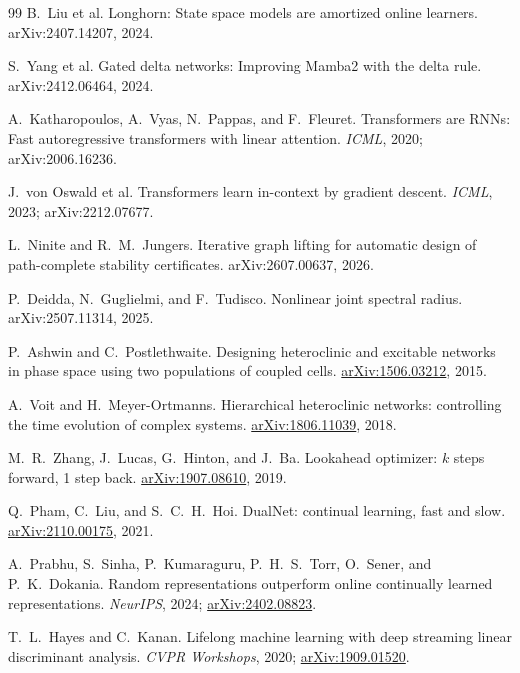 \documentclass[11pt]{article}
\begin{document}
\begin{thebibliography}{99}
 B.~Liu et al.
Longhorn: State space models are amortized online learners. arXiv:2407.14207, 2024.

 S.~Yang et al.
Gated delta networks: Improving Mamba2 with the delta rule. arXiv:2412.06464, 2024.

 A.~Katharopoulos, A.~Vyas, N.~Pappas, and F.~Fleuret.
Transformers are RNNs: Fast autoregressive transformers with linear attention.
\emph{ICML}, 2020; arXiv:2006.16236.

 J.~von Oswald et al.
Transformers learn in-context by gradient descent. \emph{ICML}, 2023; arXiv:2212.07677.

 L.~Ninite and R.~M.~Jungers.
Iterative graph lifting for automatic design of path-complete stability certificates.
arXiv:2607.00637, 2026.

 P.~Deidda, N.~Guglielmi, and F.~Tudisco.
Nonlinear joint spectral radius.
arXiv:2507.11314, 2025.

 P.~Ashwin and C.~Postlethwaite.
Designing heteroclinic and excitable networks in phase space using two
populations of coupled cells.
\href{https://arxiv.org/abs/1506.03212}{arXiv:1506.03212}, 2015.

 A.~Voit and H.~Meyer-Ortmanns.
Hierarchical heteroclinic networks: controlling the time evolution of
complex systems.
\href{https://arxiv.org/abs/1806.11039}{arXiv:1806.11039}, 2018.

 M.~R.~Zhang, J.~Lucas, G.~Hinton, and J.~Ba.
Lookahead optimizer: $k$ steps forward, 1 step back.
\href{https://arxiv.org/abs/1907.08610}{arXiv:1907.08610}, 2019.

 Q.~Pham, C.~Liu, and S.~C.~H.~Hoi.
DualNet: continual learning, fast and slow.
\href{https://arxiv.org/abs/2110.00175}{arXiv:2110.00175}, 2021.

 A.~Prabhu, S.~Sinha, P.~Kumaraguru,
P.~H.~S.~Torr, O.~Sener, and P.~K.~Dokania.
Random representations outperform online continually learned
representations.
\emph{NeurIPS}, 2024;
\href{https://arxiv.org/abs/2402.08823}{arXiv:2402.08823}.

 T.~L.~Hayes and C.~Kanan.
Lifelong machine learning with deep streaming linear discriminant analysis.
\emph{CVPR Workshops}, 2020;
\href{https://arxiv.org/abs/1909.01520}{arXiv:1909.01520}.


\end{thebibliography}
\end{document}
